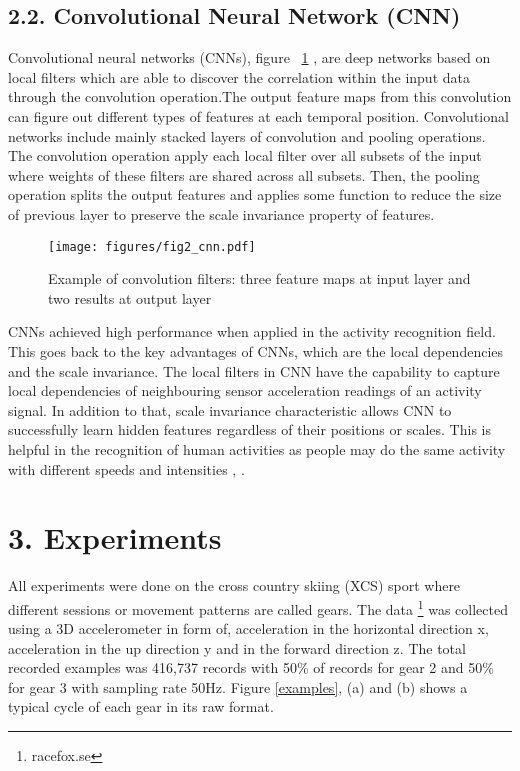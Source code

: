\documentclass[12pt,a4paper]{article}
\begin{document}
\subsection*{2.2. Convolutional Neural Network (CNN) }
 
Convolutional neural networks (CNNs), figure ~\ref{CNN} , are deep networks based on local filters which are able to discover the correlation within the input data through the convolution operation.The output feature maps from this convolution can figure out different types of features at each temporal position. Convolutional networks include mainly stacked layers of convolution and pooling operations. The convolution operation apply each local filter over all subsets of the input where weights of these filters are shared across all subsets. Then, the pooling operation splits the output features and applies some function to reduce the size of previous layer to preserve the scale invariance property of features\cite{zeng2014convolutional}. 

\begin{figure}[h!]
\centering
\texttt{[image: figures/fig2\_cnn.pdf]}
\caption{Example of convolution filters: three feature maps at input layer and two results at output layer \cite{zeng2014convolutional}}
\label{CNN}
\end{figure}

CNNs achieved high performance when applied in the activity recognition field. This goes back to the key advantages of CNNs, which are the local dependencies and the scale invariance. The local filters in CNN have the capability to capture local dependencies of neighbouring sensor acceleration readings of an activity signal. In addition to that, scale invariance characteristic allows CNN to successfully learn hidden features regardless of their positions or scales. This is helpful in the recognition of human activities as people may do the same activity with different speeds and intensities \cite{zeng2014convolutional}, \cite{yang2015deep}. 

 
\section*{3. Experiments}

All experiments were done on the cross country skiing (XCS) sport where different sessions or movement patterns are called gears. The data \footnote{racefox.se} was collected using a 3D accelerometer in form of, acceleration in the horizontal direction x, acceleration in the up direction y and in the forward direction z. The total recorded examples was 416,737 records with 50\% of records for gear 2 and 50\% for gear 3 with sampling rate 50Hz. Figure \ref{examples}, (a) and (b) shows a typical cycle of each gear in its raw format. 
\end{document}
